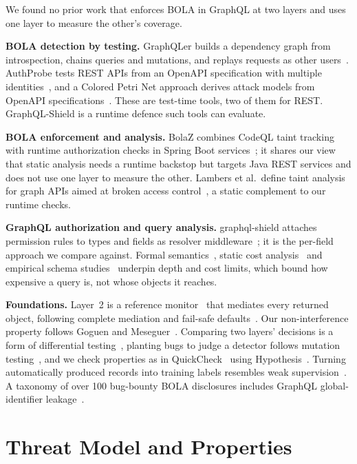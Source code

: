 \documentclass[conference]{IEEEtran}
\begin{document}
We found no prior work that enforces BOLA in GraphQL at two layers and uses one layer to measure the other's coverage.

\textbf{BOLA detection by testing.} GraphQLer builds a dependency graph from introspection, chains queries and mutations, and replays requests as other users~\cite{graphqler}. AuthProbe tests REST APIs from an OpenAPI specification with multiple identities~\cite{authprobe}, and a Colored Petri Net approach derives attack models from OpenAPI specifications~\cite{petrinet}. These are test-time tools, two of them for REST. GraphQL-Shield is a runtime defence such tools can evaluate.

\textbf{BOLA enforcement and analysis.} BolaZ combines CodeQL taint tracking with runtime authorization checks in Spring Boot services~\cite{bolaz}; it shares our view that static analysis needs a runtime backstop but targets Java REST services and does not use one layer to measure the other. Lambers et al.\ define taint analysis for graph APIs aimed at broken access control~\cite{lambers2026}, a static complement to our runtime checks.

\textbf{GraphQL authorization and query analysis.} graphql-shield attaches permission rules to types and fields as resolver middleware~\cite{graphqlshieldlib}; it is the per-field approach we compare against. Formal semantics~\cite{hartig2018}, static cost analysis~\cite{cha2020} and empirical schema studies~\cite{wittern2019} underpin depth and cost limits, which bound how expensive a query is, not whose objects it reaches.

\textbf{Foundations.} Layer~2 is a reference monitor~\cite{anderson1972} that mediates every returned object, following complete mediation and fail-safe defaults~\cite{saltzer1975}. Our non-interference property follows Goguen and Meseguer~\cite{goguen1982}. Comparing two layers' decisions is a form of differential testing~\cite{mckeeman1998}, planting bugs to judge a detector follows mutation testing~\cite{jia2011}, and we check properties as in QuickCheck~\cite{quickcheck} using Hypothesis~\cite{hypothesis}. Turning automatically produced records into training labels resembles weak supervision~\cite{snorkel}. A taxonomy of over 100 bug-bounty BOLA disclosures includes GraphQL global-identifier leakage~\cite{bolataxonomy}.

\section{Threat Model and Properties}
\end{document}
